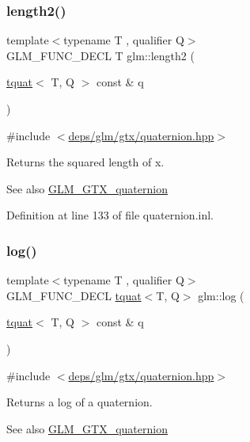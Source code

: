 \subsubsection{\texorpdfstring{length2()}{length2()}}
{\footnotesize\ttfamily template$<$typename T , qualifier Q$>$ \\
G\+L\+M\+\_\+\+F\+U\+N\+C\+\_\+\+D\+E\+CL T glm\+::length2 (\begin{DoxyParamCaption}\item[{\hyperlink{structglm_1_1tquat}{tquat}$<$ T, Q $>$ const \&}]{q }\end{DoxyParamCaption})}



{\ttfamily \#include $<$\hyperlink{gtx_2quaternion_8hpp}{deps/glm/gtx/quaternion.\+hpp}$>$}

Returns the squared length of x.

\begin{DoxySeeAlso}{See also}
\hyperlink{group__gtx__quaternion}{G\+L\+M\+\_\+\+G\+T\+X\+\_\+quaternion} 
\end{DoxySeeAlso}


Definition at line 133 of file quaternion.\+inl.

\mbox{\label{group__gtx__quaternion_gaad510f1a4ea26994b341c094ec4f4eed}} 
\subsubsection{\texorpdfstring{log()}{log()}}
{\footnotesize\ttfamily template$<$typename T , qualifier Q$>$ \\
G\+L\+M\+\_\+\+F\+U\+N\+C\+\_\+\+D\+E\+CL \hyperlink{structglm_1_1tquat}{tquat}$<$T, Q$>$ glm\+::log (\begin{DoxyParamCaption}\item[{\hyperlink{structglm_1_1tquat}{tquat}$<$ T, Q $>$ const \&}]{q }\end{DoxyParamCaption})}



{\ttfamily \#include $<$\hyperlink{gtx_2quaternion_8hpp}{deps/glm/gtx/quaternion.\+hpp}$>$}

Returns a log of a quaternion.

\begin{DoxySeeAlso}{See also}
\hyperlink{group__gtx__quaternion}{G\+L\+M\+\_\+\+G\+T\+X\+\_\+quaternion} 
\end{DoxySeeAlso}



